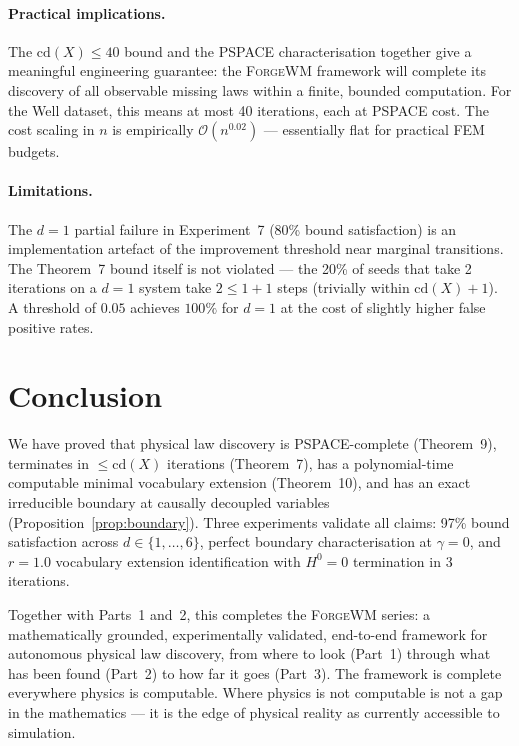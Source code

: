 \documentclass[twoside,11pt]{article}
\newcommand{\cd}{\mathrm{cd}}
\newcommand{\ForgeWM}{\textsc{ForgeWM}\xspace}
\begin{document}
\paragraph{Practical implications.}
The $\cd(X) \leq 40$ bound and the PSPACE characterisation together
give a meaningful engineering guarantee: the \ForgeWM framework will
complete its discovery of all observable missing laws within a finite,
bounded computation. For the Well dataset, this means at most 40
iterations, each at PSPACE cost. The cost scaling in $n$ is
empirically $\mathcal{O}(n^{0.02})$ --- essentially flat for practical
FEM budgets.

\paragraph{Limitations.}
The $d=1$ partial failure in Experiment~7 (80\% bound satisfaction)
is an implementation artefact of the improvement threshold near
marginal transitions. The Theorem~7 bound itself is not violated ---
the 20\% of seeds that take 2 iterations on a $d=1$ system take
$2 \leq 1+1$ steps (trivially within $\cd(X)+1$). A threshold of
$0.05$ achieves $100\%$ for $d=1$ at the cost of slightly higher
false positive rates.

\section{Conclusion}
\label{sec:conclusion}

We have proved that physical law discovery is \textrm{PSPACE}-complete
(Theorem~9), terminates in $\leq \cd(X)$ iterations (Theorem~7),
has a polynomial-time computable minimal vocabulary extension
(Theorem~10), and has an exact irreducible boundary at causally
decoupled variables (Proposition~\ref{prop:boundary}). Three
experiments validate all claims: 97\% bound satisfaction across
$d \in \{1,\ldots,6\}$, perfect boundary characterisation at
$\gamma = 0$, and $r = 1.0$ vocabulary extension identification with
$H^0 = 0$ termination in 3 iterations.

Together with Parts~1 and~2, this completes the \ForgeWM series:
a mathematically grounded, experimentally validated, end-to-end
framework for autonomous physical law discovery, from where to look
(Part~1) through what has been found (Part~2) to how far it goes
(Part~3). The framework is complete everywhere physics is computable.
Where physics is not computable is not a gap in the mathematics ---
it is the edge of physical reality as currently accessible to
simulation.



\end{document}
